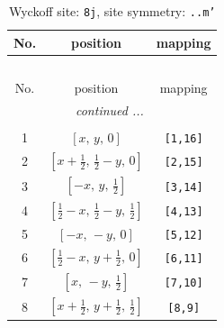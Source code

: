 \documentclass[fleqn,8pt]{jsarticle}
\begin{document}
\begin{longtable}{ccc}
\caption{Wyckoff site: {\tt 8j}, site symmetry: {\tt ..m'}}
 \\
 \hline \hline
No. & position & mapping \\ \hline \endfirsthead

\multicolumn{2}{l}{\tablename\ \thetable{}} \\
 \hline \hline
No. & position & mapping \\ \hline \endhead

 \hline \hline
\multicolumn{2}{r}{\footnotesize\it continued ...} \\ \endfoot

 \hline \hline
\multicolumn{2}{r}{} \\ \endlastfoot

1 & $\left[ x,\, y,\, 0 \right]$ & {\tt [1,16]} \\ \hline
2 & $\left[ x + \frac{1}{2},\, \frac{1}{2} - y,\, 0 \right]$ & {\tt [2,15]} \\ \hline
3 & $\left[ - x,\, y,\, \frac{1}{2} \right]$ & {\tt [3,14]} \\ \hline
4 & $\left[ \frac{1}{2} - x,\, \frac{1}{2} - y,\, \frac{1}{2} \right]$ & {\tt [4,13]} \\ \hline
5 & $\left[ - x,\, - y,\, 0 \right]$ & {\tt [5,12]} \\ \hline
6 & $\left[ \frac{1}{2} - x,\, y + \frac{1}{2},\, 0 \right]$ & {\tt [6,11]} \\ \hline
7 & $\left[ x,\, - y,\, \frac{1}{2} \right]$ & {\tt [7,10]} \\ \hline
8 & $\left[ x + \frac{1}{2},\, y + \frac{1}{2},\, \frac{1}{2} \right]$ & {\tt [8,9]} \\
\end{longtable}
\renewcommand{\arraystretch}{1.2}
\end{document}
